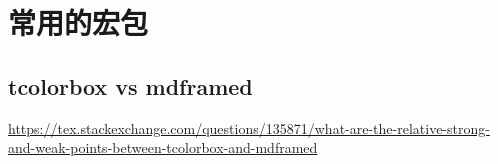 \chapter{常用的宏包}

\section{tcolorbox vs mdframed}

\url{https://tex.stackexchange.com/questions/135871/what-are-the-relative-strong-and-weak-points-between-tcolorbox-and-mdframed}